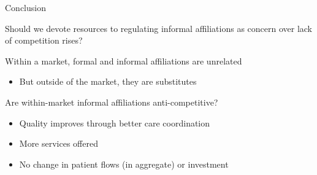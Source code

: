 \documentclass[notes,11pt, aspectratio=169]{beamer}
\newenvironment{wideitemize}{\itemize\addtolength{\itemsep}{10pt}}{\enditemize}
\begin{document}
\begin{frame}{Conclusion}
    \begin{block}{}
        Should we devote resources to regulating informal affiliations as concern over lack of competition rises?
    \end{block}

    \vspace{8mm}

    \begin{wideitemize}
        \item Within a market, formal and informal affiliations are unrelated
        \begin{itemize}
            \item But outside of the market, they are substitutes
        \end{itemize}

        \item Are within-market informal affiliations anti-competitive?
        \begin{itemize}
            \item Quality improves through better care coordination
            \item More services offered
            \item No change in patient flows (in aggregate) or investment
        \end{itemize}
        
        
    \end{wideitemize}
\end{frame}
\end{document}
